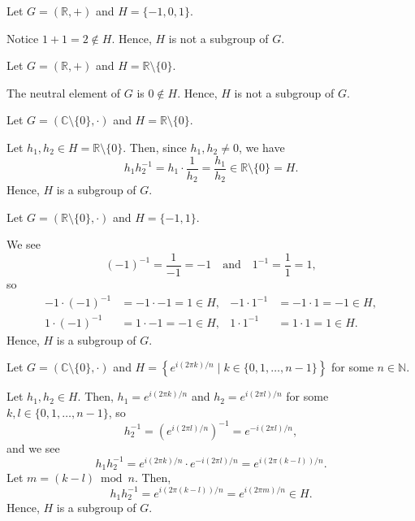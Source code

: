 \begin{exer}
Let $ G=(\mathbb{R},+) $ and $ H=\{-1,0,1\} $.
\end{exer}
\begin{sltn}
Notice $ 1+1=2\notin H $. Hence, $ H $ is not a subgroup of $ G $.
\end{sltn}

\begin{exer}
Let $ G=(\mathbb{R},+) $ and $ H=\mathbb{R}\setminus\{0\} $.
\end{exer}
\begin{sltn}
The neutral element of $ G $ is $ 0\notin H $. Hence, $ H $ is not a subgroup of $ G $.
\end{sltn}

\begin{exer}
Let $ G=(\mathbb{C}\setminus\{0\},\cdot) $ and $ H=\mathbb{R}\setminus\{0\} $.
\end{exer}
\begin{sltn}
Let $ h_1,h_2\in H=\mathbb{R}\setminus\{0\} $. Then, since $ h_1,h_2\neq 0 $, we have
\begin{equation*}
    h_1h_2^{-1}=h_1\cdot\frac{1}{h_2}=\frac{h_1}{h_2}\in\mathbb{R}\setminus\{0\}=H.
\end{equation*}
Hence, $ H $ is a subgroup of $ G $.
\end{sltn}

\begin{exer}
Let $ G=(\mathbb{R}\setminus\{0\},\cdot) $ and $ H=\{-1,1\} $.
\end{exer}
\begin{sltn}
We see
\begin{equation*}
    (-1)^{-1}=\frac{1}{-1}=-1 \quad\text{and}\quad 1^{-1}=\frac{1}{1}=1,
\end{equation*}
so
\begin{align*}
    -1\cdot(-1)^{-1}&=-1\cdot-1=1\in H, & -1\cdot 1^{-1}&=-1\cdot 1=-1\in H, \\
    1\cdot(-1)^{-1}&=1\cdot-1=-1\in H, & 1\cdot 1^{-1}&=1\cdot 1=1\in H.
\end{align*}
Hence, $ H $ is a subgroup of $ G $.
\end{sltn}

\begin{exer}
Let $ G=(\mathbb{C}\setminus\{0\},\cdot) $ and $ H=\left\{e^{i(2\pi k)/n}\mid k\in\{0,1,\ldots,n-1\}\right\} $ for some $ n\in\mathbb{N} $.
\end{exer}
\begin{sltn}
Let $ h_1,h_2\in H $. Then, $ h_1=e^{i(2\pi k)/n} $ and $ h_2=e^{i(2\pi l)/n} $ for some $ k,l\in\{0,1,\ldots,n-1\} $, so
\begin{equation*}
    h_2^{-1}=\left(e^{i(2\pi l)/n}\right)^{-1}=e^{-i(2\pi l)/n},
\end{equation*}
and we see
\begin{equation*}
    h_1h_2^{-1}=e^{i(2\pi k)/n}\cdot e^{-i(2\pi l)/n}=e^{i(2\pi(k-l))/n}.
\end{equation*}
Let $ m=(k-l)\bmod n $. Then,
\begin{equation*}
    h_1h_2^{-1}=e^{i(2\pi(k-l))/n}=e^{i(2\pi m)/n}\in H.
\end{equation*}
Hence, $ H $ is a subgroup of $ G $.
\end{sltn}

